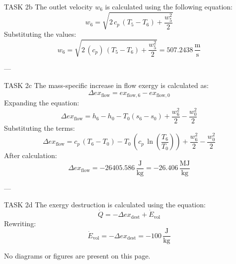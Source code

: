 TASK 2b  
The outlet velocity \( w_6 \) is calculated using the following equation:  
\[
w_6 = \sqrt{2 \, c_p \, (T_5 - T_6) + \frac{w_5^2}{2}}
\]  
Substituting the values:  
\[
w_6 = \sqrt{2 \, (c_p) \, (T_5 - T_6) + \frac{w_5^2}{2}} = 507.2438 \, \frac{\text{m}}{\text{s}}
\]  

---

TASK 2c  
The mass-specific increase in flow exergy is calculated as:  
\[
\Delta ex_{\text{flow}} = ex_{\text{flow},6} - ex_{\text{flow},0}
\]  
Expanding the equation:  
\[
\Delta ex_{\text{flow}} = h_6 - h_0 - T_0 (s_6 - s_0) + \frac{w_6^2}{2} - \frac{w_0^2}{2}
\]  
Substituting the terms:  
\[
\Delta ex_{\text{flow}} = c_p \, (T_6 - T_0) - T_0 \, (c_p \, \ln \left(\frac{T_6}{T_0}\right)) + \frac{w_6^2}{2} - \frac{w_0^2}{2}
\]  
After calculation:  
\[
\Delta ex_{\text{flow}} = -26405.586 \, \frac{\text{J}}{\text{kg}} = -26.406 \, \frac{\text{MJ}}{\text{kg}}
\]  

---

TASK 2d  
The exergy destruction is calculated using the equation:  
\[
\dot{Q} = -\Delta ex_{\text{dest}} + \dot{E}_{\text{vol}}
\]  
Rewriting:  
\[
\dot{E}_{\text{vol}} = -\Delta ex_{\text{dest}} = -100 \, \frac{\text{J}}{\text{kg}}
\]  

No diagrams or figures are present on this page.